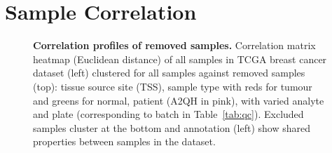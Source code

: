 \appendix


\chapter{Sample Correlation}
\label{appendix:sample_correlation}

\begin{figure}[!ht]
  \begin{center}
   \end{center}
   \caption[Correlation profiles of removed samples]{\small \textbf{Correlation profiles of removed samples.} Correlation matrix heatmap (Euclidean distance) of all samples in TCGA breast cancer dataset (left) clustered for all samples against removed samples (top): tissue source site (TSS), sample type with reds for tumour and greens for normal, patient (A2QH in pink), with varied analyte and plate (corresponding to batch in Table~\ref{tab:qc}). Excluded samples cluster at the bottom and annotation (left) show  shared properties between samples in the dataset.}
\label{fig:corr_map_part}
\end{figure}

